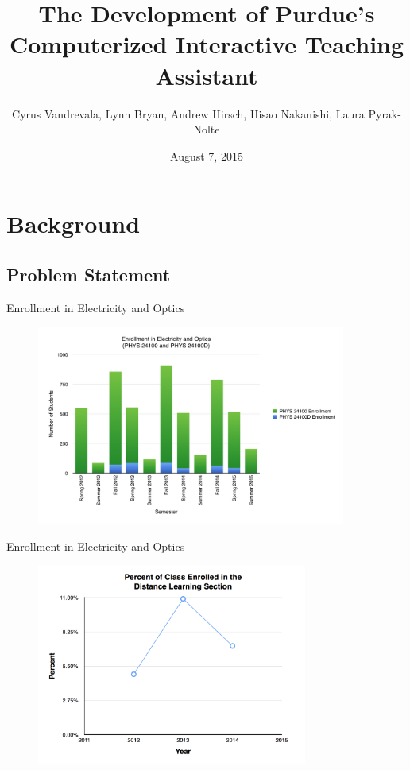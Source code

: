 \documentclass{beamer}
\title{The Development of Purdue's Computerized Interactive Teaching Assistant}
\subtitle{Cyrus Vandrevala, Lynn Bryan, Andrew Hirsch, Hisao Nakanishi, Laura Pyrak-Nolte}
\date{August 7, 2015}
\begin{document}
\begin{frame}
  \titlepage
\end{frame}

\begin{frame}
  \tableofcontents
\end{frame}

\section{Background}

\subsection*{Problem Statement}

\begin{frame}{Enrollment in Electricity and Optics}
  \begin{figure}
    \includegraphics[width=4in]{img/chapter1/enrollment}
  \end{figure}
\end{frame}

\begin{frame}{Enrollment in Electricity and Optics}
  \begin{figure}
    \includegraphics[width=3.5in]{img/chapter1/percent}
  \end{figure}
\end{frame}
\end{document}
